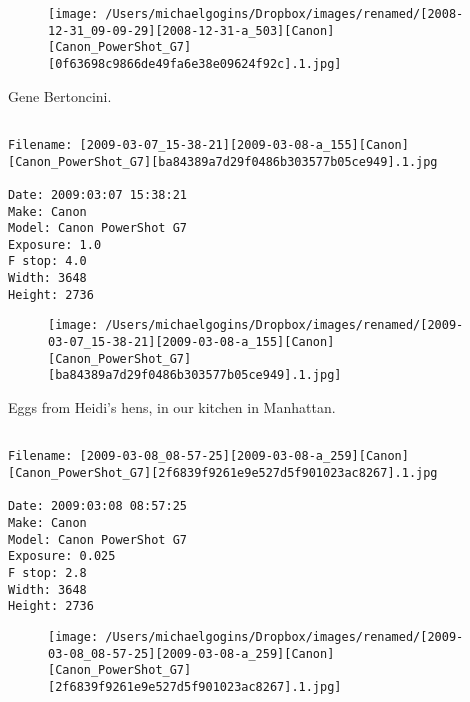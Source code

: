 \begin{figure}
\texttt{[image: /Users/michaelgogins/Dropbox/images/renamed/[2008-12-31\_09-09-29][2008-12-31-a\_503][Canon][Canon\_PowerShot\_G7][0f63698c9866de49fa6e38e09624f92c].1.jpg]}
\end{figure}
    
\clearpage
\onecolumn
\noindent Gene Bertoncini.
\noindent
\begin{lstlisting}

Filename: [2009-03-07_15-38-21][2009-03-08-a_155][Canon][Canon_PowerShot_G7][ba84389a7d29f0486b303577b05ce949].1.jpg

Date: 2009:03:07 15:38:21
Make: Canon
Model: Canon PowerShot G7
Exposure: 1.0
F stop: 4.0
Width: 3648
Height: 2736
\end{lstlisting}
\clearpage

\begin{figure}
\texttt{[image: /Users/michaelgogins/Dropbox/images/renamed/[2009-03-07\_15-38-21][2009-03-08-a\_155][Canon][Canon\_PowerShot\_G7][ba84389a7d29f0486b303577b05ce949].1.jpg]}
\end{figure}
    
\clearpage
\onecolumn
\noindent Eggs from Heidi's hens, in our kitchen in Manhattan.
\noindent
\begin{lstlisting}

Filename: [2009-03-08_08-57-25][2009-03-08-a_259][Canon][Canon_PowerShot_G7][2f6839f9261e9e527d5f901023ac8267].1.jpg

Date: 2009:03:08 08:57:25
Make: Canon
Model: Canon PowerShot G7
Exposure: 0.025
F stop: 2.8
Width: 3648
Height: 2736
\end{lstlisting}
\clearpage

\begin{figure}
\texttt{[image: /Users/michaelgogins/Dropbox/images/renamed/[2009-03-08\_08-57-25][2009-03-08-a\_259][Canon][Canon\_PowerShot\_G7][2f6839f9261e9e527d5f901023ac8267].1.jpg]}
\end{figure}
    
